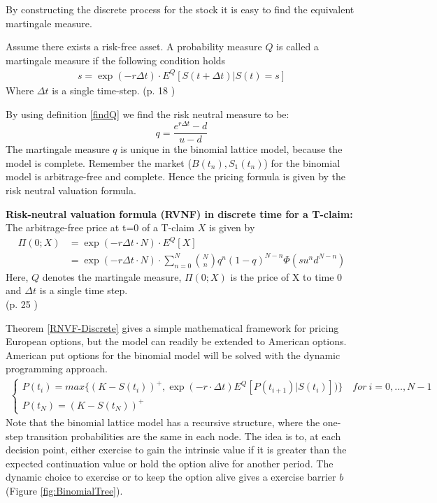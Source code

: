 By constructing the discrete process for the stock it is easy to find the equivalent martingale measure. 
\begin{definition}\label{findQ}
Assume there exists a risk-free asset. A probability measure $Q$ is called a martingale measure if the following condition holds 
\begin{align*}
s= \exp(- r \Delta t) \cdot E^Q[S(t+\Delta t)|S(t)=s] 
\end{align*}
Where $\Delta t$ is a single time-step. \hfill (p. 18 \parencite{Bjork19})
\end{definition}
By using definition \ref{findQ} we find the risk neutral measure to be:
$$q=\frac{e^{r \Delta t}-d}{u-d}$$
The martingale measure $q$ is unique in the binomial lattice model, because the model is complete. Remember the market ($B(t_n), S_1(t_n)$) for the binomial model is arbitrage-free and complete. Hence the pricing formula is given by the risk neutral valuation formula.
\begin{theorem}{\textbf{Risk-neutral valuation formula (RVNF) in discrete time for a T-claim: }}\label{RNVF-Discrete}
The arbitrage-free price at t=0 of a T-claim $X$ is given by
\begin{align*}
\Pi(0;X)&= \exp(- r \Delta t \cdot N) \cdot E^Q[X]\\
&=\exp(- r \Delta t \cdot N) \cdot \sum_{n=0}^{N} \binom{N}{n} q^n (1-q)^{N-n} \Phi(su^n d^{N-n})
\end{align*}
Here, $Q$ denotes the martingale measure, $\Pi(0;X)$ is the price of X to time 0 and $\Delta t$ is a single time step. \\
\null \hfill (p. 25 \parencite{Bjork19})
\end{theorem}

Theorem \ref{RNVF-Discrete} gives a simple mathematical framework for pricing European options, but the model can readily be extended to American options. American put options for the binomial model will be solved with the dynamic programming approach. 
\begin{equation*}\label{BellmanEq2}
\begin{split}
\begin{cases}
          P(t_i) = max\{ (K-S(t_i))^+, \exp(-r\cdot \Delta t) E^Q[P(t_{i+1})|S(t_i)])\} \quad for \ i={0,\ldots,N-1} \\
          P(t_N) = (K-S(t_N))^+ 
\end{cases}
\end{split}
\end{equation*}
Note that the binomial lattice model has a recursive structure, where the one-step transition probabilities are the same in each node. The idea is to, at each decision point, either exercise to gain the intrinsic value if it is greater than the expected continuation value or hold the option alive for another period. The dynamic choice to exercise or to keep the option alive gives a exercise barrier $b$ (Figure \ref{fig:BinomialTree}).\\


